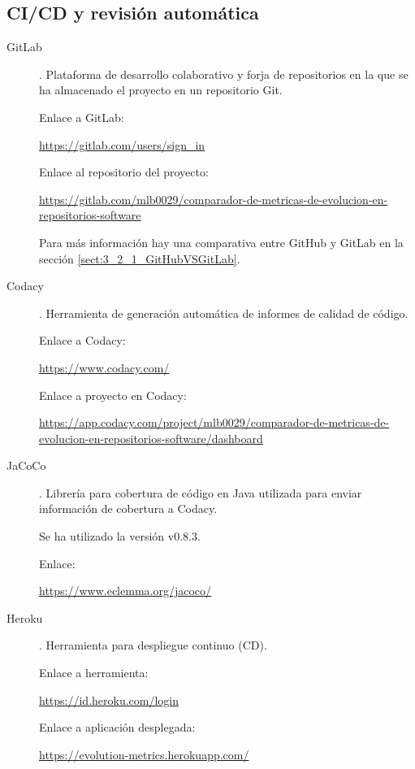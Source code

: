 \subsection{CI/CD y revisión automática}
\begin{description}
	\item[GitLab]. Plataforma de desarrollo colaborativo y forja de repositorios en la que se ha almacenado el proyecto en un repositorio Git.
	
		Enlace a GitLab:
		
		\url{https://gitlab.com/users/sign_in}
		
		Enlace al repositorio del proyecto:
		
		\href{https://gitlab.com/mlb0029/comparador-de-metricas-de-evolucion-en-repositorios-software}{https://gitlab.com/mlb0029/comparador-de-metricas-de-evolucion-en-repositorios-software}
		
		Para más información hay una comparativa entre GitHub y GitLab en la sección \ref{sect:3_2_1_GitHubVSGitLab}.
		
	\item[Codacy]. Herramienta de generación automática de informes de calidad de código.
	
		 Enlace a Codacy:
		 
		 \url{https://www.codacy.com/}
		 
		 Enlace a proyecto en Codacy: 
		 
		 \href{https://app.codacy.com/project/mlb0029/comparador-de-metricas-de-evolucion-en-repositorios-software/dashboard}{https://app.codacy.com/project/mlb0029/comparador-de-metricas-de-evolucion-en-repositorios-software/dashboard}
	
	\item[JaCoCo]. Librería para cobertura de código en Java utilizada para enviar información de cobertura a Codacy.
	
		Se ha utilizado la versión v0.8.3.
		
		Enlace:
		
		\url{https://www.eclemma.org/jacoco/}
	
	\item[Heroku]. Herramienta para despliegue continuo (CD).
	
		Enlace a herramienta:
		
		\url{https://id.heroku.com/login}
		
		Enlace a aplicación desplegada:
		
		\url{https://evolution-metrics.herokuapp.com/}
	
\end{description}
